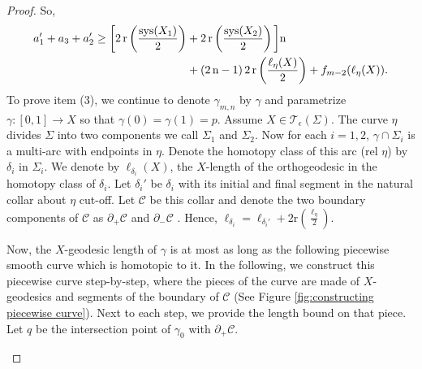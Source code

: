 \documentclass[12pt]{amsart}
\numberwithin{equation}{section}
\theoremstyle{plain}
\begin{document}
\begin{proof}
So,
\begin{align}
    \begin{split}
a_1' + a_3 + a_2' \geq \bigg[2 \, \text{r} \left(\frac{\textup{sys}(X_{1})} {2}\right) &+ 2 \, \text{r} \left(\frac{\textup{sys}(X_{2})} {2}\right)\bigg] \text{n} \\
&+ (2 \,\text{n}-1) \,2 \, \text{r} \left(\frac{\ell_{\eta} (X)} {2}\right) + f_{m-2}(\ell_{\eta}(X)).\\
        \end{split}
\end{align}
To prove item (3), we continue to denote $\gamma_{m,n}$ by $\gamma$ and parametrize  $\gamma : [0,1] \rightarrow X$ so that 
$\gamma(0)=\gamma(1)=p$. Assume  $X \in \mathcal{T}_{\epsilon}(\Sigma)$.
The curve $\eta$ divides $\Sigma$ into two components we call $\Sigma_{1}$  and $\Sigma_{2}$. 
Now for each $i=1,2$, $\gamma \cap \Sigma_{i}$ is a multi-arc  with endpoints in $\eta$. Denote the homotopy class of  this arc (rel $\eta$) by  $\delta_{i}$   in 
$\Sigma_{i}$.
 We denote by $\ell_{\delta_i}(X)$, the $X$-length of the orthogeodesic in the homotopy class of $\delta_i$.
Let $\delta_i'$ be $\delta_i$ with its initial and final segment in the natural collar about $\eta$ cut-off. Let $\mathcal{C}$ be this collar and denote the two boundary components of $\mathcal{C}$ as $\partial_{+} \mathcal{C}$ and $\partial_{-} \mathcal{C}$ .  Hence, $\ell_{\delta_i} = \ell_{\delta_i'} + 2\text{r} \left (\frac{\ell_{\eta}}{2} \right )$.
 
 Now, the $X$-geodesic length of $\gamma$ is at most as long as the following piecewise smooth curve which is homotopic to it. In the following, we construct this piecewise curve step-by-step, where the pieces of the curve are made of $X$-geodesics and segments of the boundary of $\mathcal{C}$ (See Figure  \ref{fig:constructing piecewise curve}). Next to each step, we provide the length bound on that piece.  Let $q$ be the intersection point of $\gamma_0$ with $\partial_{+} \mathcal{C}$. 
 

 \begin{center}\begin{table}


\end{table}
\end{center}
\end{proof}
\end{document}

